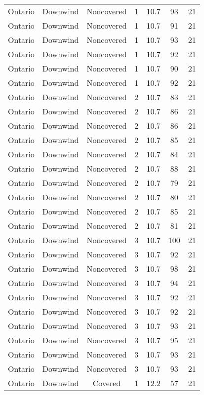 \documentclass{article}
\begin{document}
\begin{longtable}[H]{ccccccc}
Ontario & Downwind & Noncovered & 1 & 10.7 & 93  & 21 \\
Ontario & Downwind & Noncovered & 1 & 10.7 & 91  & 21 \\
Ontario & Downwind & Noncovered & 1 & 10.7 & 93  & 21 \\
Ontario & Downwind & Noncovered & 1 & 10.7 & 92  & 21 \\
Ontario & Downwind & Noncovered & 1 & 10.7 & 90  & 21 \\
Ontario & Downwind & Noncovered & 1 & 10.7 & 92  & 21 \\
Ontario & Downwind & Noncovered & 2 & 10.7 & 83  & 21 \\
Ontario & Downwind & Noncovered & 2 & 10.7 & 86  & 21 \\
Ontario & Downwind & Noncovered & 2 & 10.7 & 86  & 21 \\
Ontario & Downwind & Noncovered & 2 & 10.7 & 85  & 21 \\
Ontario & Downwind & Noncovered & 2 & 10.7 & 84  & 21 \\
Ontario & Downwind & Noncovered & 2 & 10.7 & 88  & 21 \\
Ontario & Downwind & Noncovered & 2 & 10.7 & 79  & 21 \\
Ontario & Downwind & Noncovered & 2 & 10.7 & 80  & 21 \\
Ontario & Downwind & Noncovered & 2 & 10.7 & 85  & 21 \\
Ontario & Downwind & Noncovered & 2 & 10.7 & 81  & 21 \\
Ontario & Downwind & Noncovered & 3 & 10.7 & 100 & 21 \\
Ontario & Downwind & Noncovered & 3 & 10.7 & 92  & 21 \\
Ontario & Downwind & Noncovered & 3 & 10.7 & 98  & 21 \\
Ontario & Downwind & Noncovered & 3 & 10.7 & 94  & 21 \\
Ontario & Downwind & Noncovered & 3 & 10.7 & 92  & 21 \\
Ontario & Downwind & Noncovered & 3 & 10.7 & 92  & 21 \\
Ontario & Downwind & Noncovered & 3 & 10.7 & 93  & 21 \\
Ontario & Downwind & Noncovered & 3 & 10.7 & 95  & 21 \\
Ontario & Downwind & Noncovered & 3 & 10.7 & 93  & 21 \\
Ontario & Downwind & Noncovered & 3 & 10.7 & 93  & 21 \\
Ontario & Downwind & Covered     & 1 & 12.2 & 57  & 21 \\

\end{longtable}
\end{document}
